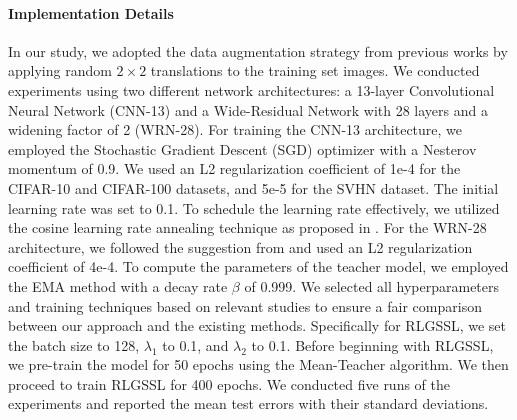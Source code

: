 \paragraph{Implementation Details}  
In our study, we adopted the data augmentation strategy from previous works \cite{luo2018smooth,tarvainen2017mean} by applying random $2 \times 2$ translations to the training set images.  
We conducted experiments using two different
network architectures: a 13-layer Convolutional Neural Network (CNN-13) and a Wide-Residual Network with 28 layers and a widening factor of 2 (WRN-28). For training the CNN-13 architecture, we employed the Stochastic Gradient Descent (SGD) optimizer with a Nesterov momentum of 0.9. We used an L2 regularization coefficient of 1e-4 for the CIFAR-10 and CIFAR-100 datasets, and 5e-5 for the SVHN dataset. The initial learning rate 
was set to 0.1. To schedule the learning rate effectively, we utilized the cosine learning rate annealing technique as proposed in \cite{loshchilov2017sgdr,verma2022interpolation}. For the WRN-28 architecture, we followed the suggestion from \cite{berthelot2019mixmatch} and used an L2 regularization coefficient of 4e-4. 
To compute the parameters of the teacher model, 
we employed the EMA method with a decay rate $\beta$ of 0.999. 
We selected all hyperparameters and training techniques based on relevant studies to ensure a fair comparison between our approach and the existing methods. 
Specifically for RLGSSL, we set the batch size to 128, $\lambda_1$ to 0.1, and $\lambda_2$ to 0.1. Before beginning with RLGSSL, we pre-train the model for 50 epochs using the Mean-Teacher algorithm. We then proceed to train RLGSSL for 400 epochs. We conducted five runs of the experiments and reported the mean test errors with their standard deviations.


